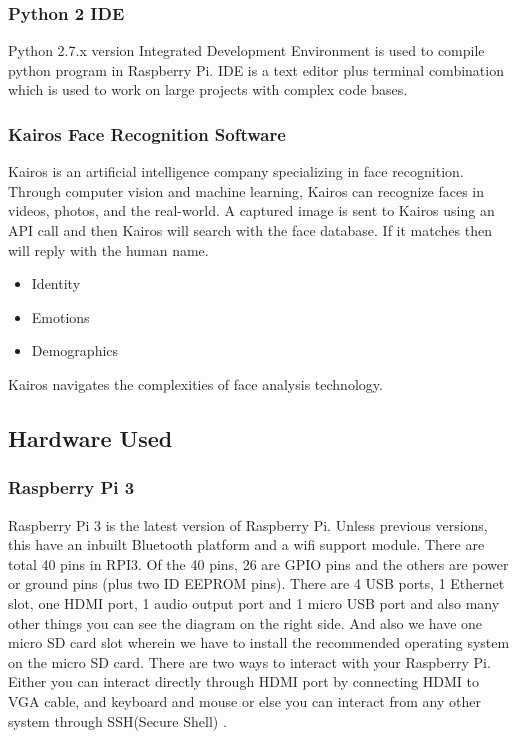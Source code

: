 \documentclass[sigconf]{acmart}
\begin{document}
\subsubsection{Python 2 IDE}
Python 2.7.x version Integrated Development Environment is used to compile python 
program in Raspberry Pi. IDE is a text editor plus terminal combination which is 
used to work on large projects with complex code bases.

\subsubsection{Kairos Face Recognition Software}
Kairos is an artificial intelligence company specializing in face recognition. 
Through computer vision and machine learning, Kairos can recognize faces in videos,
photos, and the real-world. A captured image is sent to Kairos using an API call 
and then Kairos will search with the face database. If it matches then will reply 
with the human name.

\begin{itemize}
\item Identity
\item Emotions
\item Demographics
\end{itemize}

Kairos navigates the complexities of face analysis technology.

\subsection{Hardware Used}
\subsubsection{Raspberry Pi 3}
Raspberry Pi 3 is the latest version of Raspberry Pi. Unless previous versions, 
this have an inbuilt Bluetooth platform and a wifi support module. There are total 
40 pins in RPI3. Of the 40 pins, 26 are GPIO pins and the others are power or ground 
pins (plus two ID EEPROM pins). There are 4 USB ports, 1 Ethernet slot, one HDMI port, 
1 audio output port and 1 micro USB port and also many other things you can see the 
diagram on the right side. And also we have one micro SD card slot wherein we have to 
install the recommended operating system on the micro SD card. There are two ways to 
interact with your Raspberry Pi. Either you can interact directly through HDMI port 
by connecting HDMI to VGA cable, and keyboard and mouse or else you can interact 
from any other system through SSH(Secure Shell) \cite{deligence2017}. 
\end{document}
